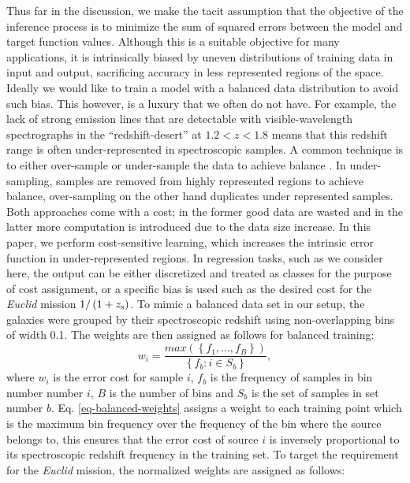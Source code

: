 \documentclass[useAMS,usenatbib,fleqn]{mn2e}
\begin{document}
Thus far in the discussion, we make the tacit assumption that the objective of the inference process is to minimize the sum of squared errors between the model and target function values. Although this is a suitable objective for many applications, it is intrinsically biased by uneven distributions of training data in input and output, sacrificing accuracy in less represented regions of the space. Ideally we would like to train a model with a balanced data distribution to avoid such bias. This however, is a luxury that we often do not have. For example, the lack of strong emission lines that are detectable with visible-wavelength spectrographs in the ``redshift-desert'' at $1.2 < z <1.8$ means that this redshift range is often under-represented in spectroscopic samples. A common technique is to either over-sample or under-sample the data to achieve balance \citep{weiss2007}. In under-sampling, samples are removed from highly represented regions to achieve balance, over-sampling on the other hand duplicates under represented samples. Both approaches come with a cost; in the former good data are wasted and in the latter more computation is introduced due to the data size increase. In this paper, we perform cost-sensitive learning, which increases the intrinsic error function in under-represented regions. In regression tasks, such as we consider here, the output can be either discretized and treated as classes for the purpose of cost assignment, or a specific bias is used such as the desired cost for the {\em Euclid} mission $1/\left(1+z_{\rm s}\right)$. To mimic a balanced data set in our setup, the galaxies were grouped by their spectroscopic redshift using non-overlapping bins of width 0.1. The weights are then assigned as follows for balanced training:
\begin{equation}
\label{eq-balanced-weights}
w_{i} = \frac{max\left(\left \{f_{1},\hdots,f_{B}\right\}\right)}{\left\{f_{b}:i\in S_{b}\right\}},
\end{equation}
where $w_{i}$ is the error cost for sample $i$, $f_{b}$ is the frequency of samples in bin number number $i$, $B$ is the number of bins and $S_{b}$ is the set of samples in set number $b$. Eq. \ref{eq-balanced-weights} assigns a weight to each training point which is the maximum bin frequency over the frequency of the bin where the source belongs to, this ensures that the error cost of source $i$ is inversely proportional to its spectroscopic redshift frequency in the training set. To target the requirement for the {\em Euclid} mission, the normalized weights are assigned as follows:
\end{document}
